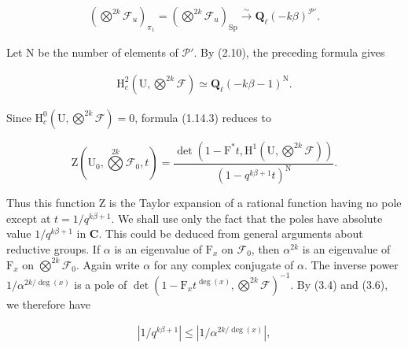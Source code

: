 \documentclass[10pt,leqno]{article}
\begin{document}
\begin{equation*}\begin{gathered}(\bigotimes\limits^{2k}\mathcal{F} _{u})_{\pi _{1}} = (\bigotimes\limits^{2k}\mathcal{F} _{u})_{\operatorname{Sp}} \xrightarrow{\sim } \mathbf{Q}_{\ell }(- k\beta )^{\mathcal{P} '}.\end{gathered}\end{equation*}

\noindent Let \(\mathrm{N}\) be the number of elements of \(\mathcal{P} '\). By (2.10), the preceding formula gives\par

\begin{equation*}\begin{gathered}\mathrm{H}_{c}^{2}(\mathrm{U},\bigotimes\limits^{2k}\mathcal{F} ) \simeq  \mathbf{Q}_{\ell }(- k\beta - 1)^{\mathrm{N}}.\end{gathered}\end{equation*}

\noindent Since \(\mathrm{H}_{c}^{0}(\mathrm{U},\bigotimes\limits^{2k}\mathcal{F} )=0\), formula (1.14.3) reduces to\par

\[\mathrm{Z}(\mathrm{U}_{0},\bigotimes\limits^{2k}\mathcal{F} _{0},t)=\frac{\operatorname{det}(1- \mathrm{F}^{*}t,\mathrm{H}^{1}(\mathrm{U},\bigotimes\limits^{2k}\mathcal{F} ))}{(1- q^{k\beta +1}t)^{\mathrm{N}}}.\]

\noindent Thus this function \(\mathrm{Z}\) is the Taylor expansion of a rational function having no pole except at \(t=1/q^{k\beta +1}\). We shall use only the fact that the poles have absolute value \(1/q^{k\beta +1}\) in \(\mathbf{C}\). This could be deduced from general arguments about reductive groups. If \(\alpha \) is an eigenvalue of \(\mathrm{F}_{x}\) on \(\mathcal{F} _{0}\), then \(\alpha ^{2k}\) is an eigenvalue of \(\mathrm{F}_{x}\) on \(\bigotimes\limits^{2k}\mathcal{F} _{0}\). Again write \(\alpha \) for any complex conjugate of \(\alpha \). The inverse power \(1/\alpha ^{2k/\operatorname{deg}(x)}\) is a pole of \(\operatorname{det}(1- \mathrm{F}_{x} t^{\operatorname{deg}(x)},\bigotimes\limits^{2k}\mathcal{F} )^{- 1}\). By (3.4) and (3.6), we therefore have\par

\begin{equation*}\begin{gathered}|1/q^{k\beta +1}| \leq  |1/\alpha ^{2k/\operatorname{deg}(x)}|,\end{gathered}\end{equation*}
\end{document}
